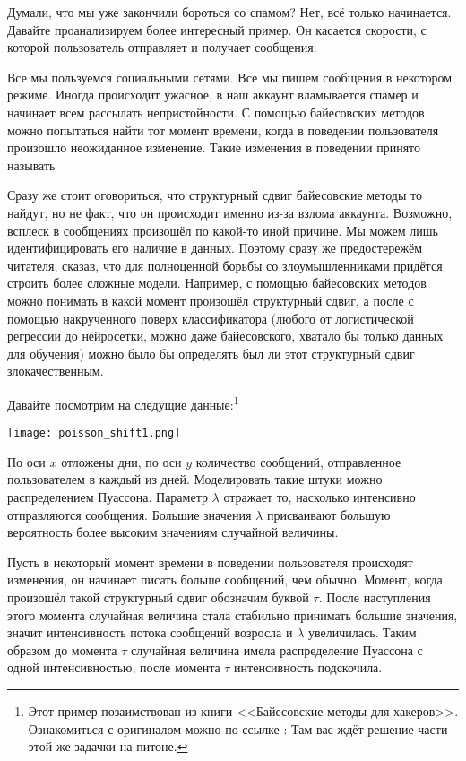 Думали, что мы уже закончили бороться со спамом? Нет, всё только начинается.  Давайте проанализируем более интересный пример. Он касается скорости, с которой пользователь отправляет и получает сообщения. 

Все мы пользуемся социальными сетями. Все мы пишем сообщения в некотором режиме. Иногда происходит ужасное, в наш аккаунт вламывается спамер и начинает всем рассылать непристойности. С помощью байесовских методов можно попытаться найти тот момент времени, когда в поведении пользователя произошло неожиданное изменение. Такие изменения в поведении принято называть 

Сразу же стоит оговориться, что структурный сдвиг байесовские методы то найдут, но не факт, что он происходит именно из-за взлома аккаунта. Возможно, всплеск в сообщениях произошёл по какой-то иной причине.  Мы можем лишь идентифицировать его наличие в данных. Поэтому сразу же предостережём читателя, сказав, что для полноценной борьбы со злоумышленниками придётся строить более сложные модели. Например, с помощью байесовских методов можно понимать в какой момент произошёл структурный сдвиг, а после с помощью накрученного поверх классификатора (любого от логистической регрессии до нейросетки, можно даже байесовского, хватало бы только данных для обучения) можно было бы определять был ли этот структурный сдвиг злокачественным. 

Давайте посмотрим на \href{https://raw.githubusercontent.com/FUlyankin/bayes_book/master/itog_scripts/poisson_shift/message.csv}{следущие данные:}\footnote{Этот пример позаимствован из книги <<Байесовские методы для хакеров>>. Ознакомиться с оригиналом можно по ссылке : \url{ } Там вас ждёт решение части этой же задачки на питоне.}

\begin{center}
\texttt{[image: poisson\_shift1.png]}
\end{center} 

По оси $x$ отложены дни, по оси $y$ количество сообщений, отправленное пользователем в каждый из дней.  Моделировать такие штуки можно распределением Пуассона. Параметр $\lambda$ отражает то, насколько интенсивно отправляются сообщения. Большие значения $\lambda$ присваивают большую вероятность более высоким значениям случайной величины. 

Пусть в некоторый момент времени в поведении пользователя происходят изменения, он начинает писать больше сообщений, чем обычно. Момент, когда произошёл такой структурный сдвиг обозначим буквой $\tau$. После наступления этого момента случайная величина стала стабильно принимать большие значения, значит интенсивность потока сообщений возросла и $\lambda$ увеличилась. Таким образом до момента $\tau$ случайная величина имела распределение Пуассона с одной интенсивностью, после момента $\tau$ интенсивность подскочила. 

